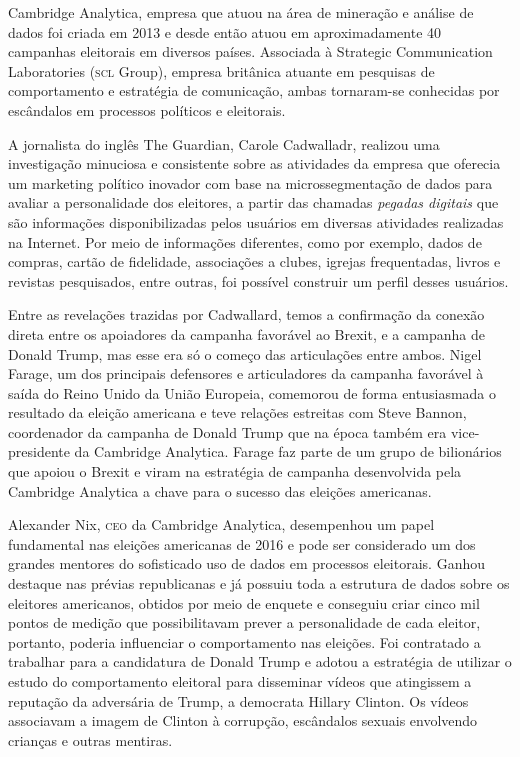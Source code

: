 Cambridge Analytica, empresa que atuou na área de mineração e análise de
dados foi criada em 2013 e desde então atuou em aproximadamente 40
campanhas eleitorais em diversos países. Associada à Strategic
Communication Laboratories (\textsc{scl} Group), empresa britânica atuante em
pesquisas de comportamento e estratégia de comunicação, ambas tornaram-se
conhecidas por escândalos em processos políticos e eleitorais.

A jornalista do inglês The Guardian, Carole Cadwalladr, realizou
uma investigação minuciosa e consistente sobre as atividades da empresa
que oferecia um marketing político inovador com base na
microssegmentação de dados para avaliar a personalidade dos eleitores, a
partir das chamadas \textit{pegadas digitais} que são informações
disponibilizadas pelos usuários em diversas atividades realizadas na
Internet. Por meio de informações diferentes, como por exemplo, dados de
compras, cartão de fidelidade, associações a clubes, igrejas
frequentadas, livros e revistas pesquisados, entre outras, foi possível
construir um perfil desses usuários.

Entre as revelações trazidas por Cadwallard, temos a confirmação da
conexão direta entre os apoiadores da campanha favorável ao Brexit, e a
campanha de Donald Trump, mas esse era só o começo das articulações
entre ambos. Nigel Farage, um dos principais defensores e articuladores
da campanha favorável à saída do Reino Unido da União Europeia,
comemorou de forma entusiasmada o resultado da eleição americana e teve
relações estreitas com Steve Bannon, coordenador da campanha de Donald
Trump que na época também era vice-presidente da Cambridge Analytica.
Farage faz parte de um grupo de bilionários que apoiou o Brexit e viram
na estratégia de campanha desenvolvida pela Cambridge Analytica a chave
para o sucesso das eleições americanas.

Alexander Nix, \textsc{ceo} da Cambridge Analytica, desempenhou um papel
fundamental nas eleições americanas de 2016 e pode ser considerado um
dos grandes mentores do sofisticado uso de dados em processos eleitorais.
Ganhou destaque nas prévias republicanas e já possuiu toda a estrutura
de dados sobre os eleitores americanos, obtidos por meio de enquete e
conseguiu criar cinco mil pontos de medição que possibilitavam prever a
personalidade de cada eleitor, portanto, poderia influenciar o
comportamento nas eleições. Foi contratado a trabalhar para a
candidatura de Donald Trump e adotou a estratégia de utilizar o estudo
do comportamento eleitoral para disseminar vídeos que atingissem a
reputação da adversária de Trump, a democrata Hillary Clinton. Os vídeos
associavam a imagem de Clinton à corrupção, escândalos sexuais
envolvendo crianças e outras mentiras.


